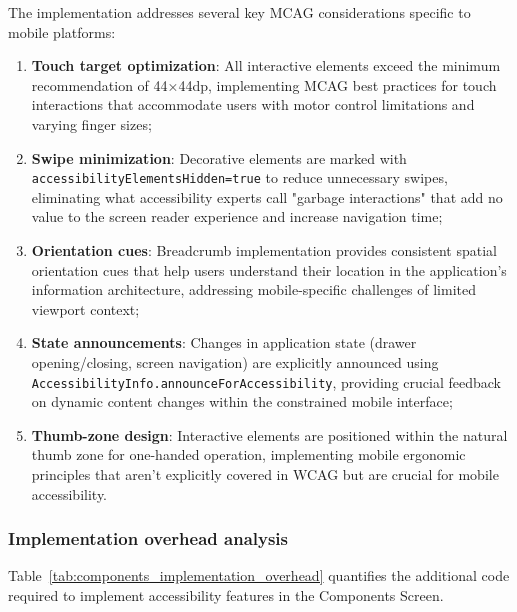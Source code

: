 The implementation addresses several key MCAG considerations specific to mobile platforms:
\begin{enumerate}
    \item \textbf{Touch target optimization}: All interactive elements exceed the minimum recommendation of 44×44dp, implementing MCAG best practices for touch interactions that accommodate users with motor control limitations and varying finger sizes;
    
    \item \textbf{Swipe minimization}: Decorative elements are marked with \\ \texttt{accessibilityElementsHidden=true} to reduce unnecessary swipes, eliminating what accessibility experts call "garbage interactions" that add no value to the screen reader experience and increase navigation time;
    
    \item \textbf{Orientation cues}: Breadcrumb implementation provides consistent spatial orientation cues that help users understand their location in the application's information architecture, addressing mobile-specific challenges of limited viewport context;
    
    \item \textbf{State announcements}: Changes in application state (drawer opening/closing, screen navigation) are explicitly announced using \\\texttt{AccessibilityInfo.announceForAccessibility}, providing crucial feedback on dynamic content changes within the constrained mobile interface;
    
    \item \textbf{Thumb-zone design}: Interactive elements are positioned within the natural thumb zone for one-handed operation, implementing mobile ergonomic principles that aren't explicitly covered in WCAG but are crucial for mobile accessibility.
\end{enumerate}

\subsubsection{Implementation overhead analysis}

Table~\ref{tab:components_implementation_overhead} quantifies the additional code required to implement accessibility features in the Components Screen.

